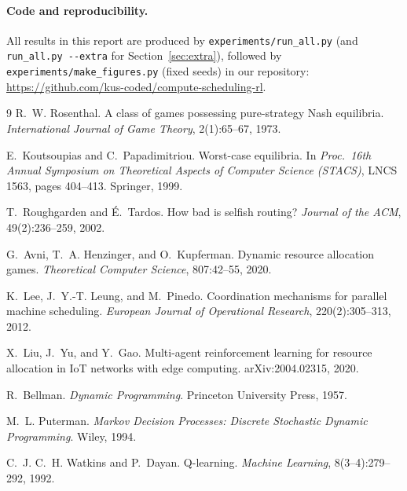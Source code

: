 \documentclass{article}
\begin{document}
\paragraph{Code and reproducibility.} All results in this report are produced by
\texttt{experiments/run\_all.py} (and \texttt{run\_all.py -{}-extra} for
Section~\ref{sec:extra}), followed by \texttt{experiments/make\_figures.py} (fixed seeds) in our repository: \url{https://github.com/kus-coded/compute-scheduling-rl}.

{\footnotesize
\setlength{\bibsep}{0pt}
\begin{thebibliography}{9}
R.~W. Rosenthal.
\newblock A class of games possessing pure-strategy {N}ash equilibria.
\newblock \emph{International Journal of Game Theory}, 2(1):65--67, 1973.

E.~Koutsoupias and C.~Papadimitriou.
\newblock Worst-case equilibria.
\newblock In \emph{Proc.\ 16th Annual Symposium on Theoretical Aspects of Computer
  Science (STACS)}, LNCS 1563, pages 404--413. Springer, 1999.

T.~Roughgarden and {\'E}.~Tardos.
\newblock How bad is selfish routing?
\newblock \emph{Journal of the ACM}, 49(2):236--259, 2002.

G.~Avni, T.~A. Henzinger, and O.~Kupferman.
\newblock Dynamic resource allocation games.
\newblock \emph{Theoretical Computer Science}, 807:42--55, 2020.

K.~Lee, J.~Y.-T. Leung, and M.~Pinedo.
\newblock Coordination mechanisms for parallel machine scheduling.
\newblock \emph{European Journal of Operational Research}, 220(2):305--313, 2012.

X.~Liu, J.~Yu, and Y.~Gao.
\newblock Multi-agent reinforcement learning for resource allocation in {IoT} networks
  with edge computing.
\newblock arXiv:2004.02315, 2020.

R.~Bellman.
\newblock \emph{Dynamic Programming}.
\newblock Princeton University Press, 1957.

M.~L. Puterman.
\newblock \emph{Markov Decision Processes: Discrete Stochastic Dynamic Programming}.
\newblock Wiley, 1994.

C.~J. C.~H. Watkins and P.~Dayan.
\newblock Q-learning.
\newblock \emph{Machine Learning}, 8(3--4):279--292, 1992.


\end{thebibliography}}
\end{document}
